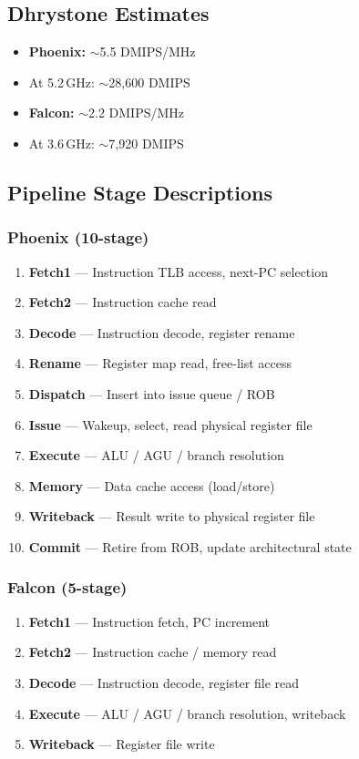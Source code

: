 \documentclass[11pt,a4paper]{article}
\begin{document}
\subsection{Dhrystone Estimates}
\begin{itemize}[nosep]
  \item \textbf{Phoenix:} $\sim$5.5 DMIPS/MHz
  \item At 5.2\,GHz: $\sim$28,600 DMIPS
  \item \textbf{Falcon:} $\sim$2.2 DMIPS/MHz
  \item At 3.6\,GHz: $\sim$7,920 DMIPS
\end{itemize}

\subsection{Pipeline Stage Descriptions}

\subsubsection*{Phoenix (10-stage)}
\begin{enumerate}[nosep]
  \item \textbf{Fetch1} --- Instruction TLB access, next-PC selection
  \item \textbf{Fetch2} --- Instruction cache read
  \item \textbf{Decode} --- Instruction decode, register rename
  \item \textbf{Rename} --- Register map read, free-list access
  \item \textbf{Dispatch} --- Insert into issue queue / ROB
  \item \textbf{Issue} --- Wakeup, select, read physical register file
  \item \textbf{Execute} --- ALU / AGU / branch resolution
  \item \textbf{Memory} --- Data cache access (load/store)
  \item \textbf{Writeback} --- Result write to physical register file
  \item \textbf{Commit} --- Retire from ROB, update architectural state
\end{enumerate}

\subsubsection*{Falcon (5-stage)}
\begin{enumerate}[nosep]
  \item \textbf{Fetch1} --- Instruction fetch, PC increment
  \item \textbf{Fetch2} --- Instruction cache / memory read
  \item \textbf{Decode} --- Instruction decode, register file read
  \item \textbf{Execute} --- ALU / AGU / branch resolution, writeback
  \item \textbf{Writeback} --- Register file write
\end{enumerate}
\end{document}
